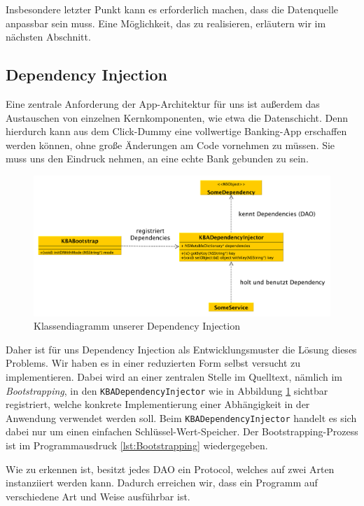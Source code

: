	Insbesondere letzter Punkt kann es erforderlich machen, dass die Datenquelle anpassbar sein muss. Eine Möglichkeit, das zu realisieren, erläutern wir im nächsten Abschnitt.

\subsection{Dependency Injection}
	Eine zentrale Anforderung der App-Architektur für uns ist außerdem das Austauschen von einzelnen Kernkomponenten, wie etwa die Datenschicht. Denn hierdurch kann aus dem Click-Dummy eine vollwertige Banking-App erschaffen werden können, ohne große Änderungen am Code vornehmen zu müssen. Sie muss uns den Eindruck nehmen, an eine echte Bank gebunden zu sein.
	
\begin{figure}[h]
	\centering
	\includegraphics[scale=.25]{Pictures/uml-di}
	\caption{Klassendiagramm unserer Dependency Injection\label{fig:UmlDi}}
\end{figure}
	
	Daher ist für uns Dependency Injection als Entwicklungsmuster die Lösung dieses Problems. Wir haben es in einer reduzierten Form selbst versucht zu implementieren. Dabei wird an einer zentralen Stelle im Quelltext, nämlich im \emph{Bootstrapping}, in den \texttt{KBADependencyInjector} wie in Abbildung \ref{fig:UmlDi} sichtbar registriert, welche konkrete Implementierung einer Abhängigkeit in der Anwendung verwendet werden soll. Beim \texttt{KBADependencyInjector} handelt es sich dabei nur um einen einfachen Schlüssel-Wert-Speicher. Der Bootstrapping-Prozess ist im Programmausdruck \ref{lst:Bootstrapping} wiedergegeben.
	
	
	
\noindent	Wie zu erkennen ist, besitzt jedes \ac{DAO} ein Protocol, welches auf zwei Arten instanziiert werden kann. Dadurch erreichen wir, dass ein Programm auf verschiedene Art und Weise ausführbar ist.
	
